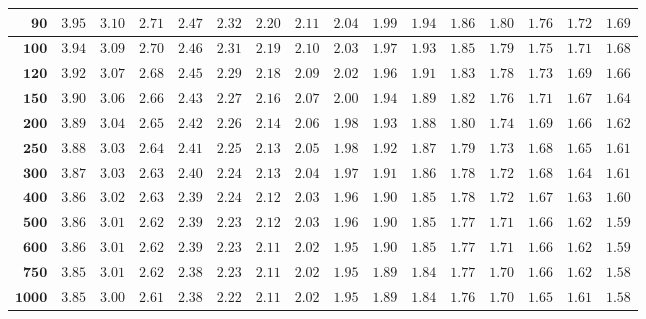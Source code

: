 \begin{customTableWrapper}{1.4}
\begin{longtable}{|r|r|r|r|r|r|r|r|r|r|r|r|r|r|r|r|}
    ${\mathbf{90}}$  & ${3.95}$   & ${3.10}$   & ${2.71}$   & ${2.47}$   & ${2.32}$   & ${2.20}$   & ${2.11}$   & ${2.04}$   & ${1.99}$   & ${1.94}$   & ${1.86}$   & ${1.80}$   & ${1.76}$   & ${1.72}$   & ${1.69}$   \\ \hline
    ${\mathbf{100}}$  & ${3.94}$   & ${3.09}$   & ${2.70}$   & ${2.46}$   & ${2.31}$   & ${2.19}$   & ${2.10}$   & ${2.03}$   & ${1.97}$   & ${1.93}$   & ${1.85}$   & ${1.79}$   & ${1.75}$   & ${1.71}$   & ${1.68}$   \\ \hline
    ${\mathbf{120}}$  & ${3.92}$   & ${3.07}$   & ${2.68}$   & ${2.45}$   & ${2.29}$   & ${2.18}$   & ${2.09}$   & ${2.02}$   & ${1.96}$   & ${1.91}$   & ${1.83}$   & ${1.78}$   & ${1.73}$   & ${1.69}$   & ${1.66}$   \\ \hline
    ${\mathbf{150}}$  & ${3.90}$   & ${3.06}$   & ${2.66}$   & ${2.43}$   & ${2.27}$   & ${2.16}$   & ${2.07}$   & ${2.00}$   & ${1.94}$   & ${1.89}$   & ${1.82}$   & ${1.76}$   & ${1.71}$   & ${1.67}$   & ${1.64}$   \\ \hline
    ${\mathbf{200}}$  & ${3.89}$   & ${3.04}$   & ${2.65}$   & ${2.42}$   & ${2.26}$   & ${2.14}$   & ${2.06}$   & ${1.98}$   & ${1.93}$   & ${1.88}$   & ${1.80}$   & ${1.74}$   & ${1.69}$   & ${1.66}$   & ${1.62}$   \\ \hline
    ${\mathbf{250}}$  & ${3.88}$   & ${3.03}$   & ${2.64}$   & ${2.41}$   & ${2.25}$   & ${2.13}$   & ${2.05}$   & ${1.98}$   & ${1.92}$   & ${1.87}$   & ${1.79}$   & ${1.73}$   & ${1.68}$   & ${1.65}$   & ${1.61}$   \\ \hline
    ${\mathbf{300}}$  & ${3.87}$   & ${3.03}$   & ${2.63}$   & ${2.40}$   & ${2.24}$   & ${2.13}$   & ${2.04}$   & ${1.97}$   & ${1.91}$   & ${1.86}$   & ${1.78}$   & ${1.72}$   & ${1.68}$   & ${1.64}$   & ${1.61}$   \\ \hline
    ${\mathbf{400}}$  & ${3.86}$   & ${3.02}$   & ${2.63}$   & ${2.39}$   & ${2.24}$   & ${2.12}$   & ${2.03}$   & ${1.96}$   & ${1.90}$   & ${1.85}$   & ${1.78}$   & ${1.72}$   & ${1.67}$   & ${1.63}$   & ${1.60}$   \\ \hline
    ${\mathbf{500}}$  & ${3.86}$   & ${3.01}$   & ${2.62}$   & ${2.39}$   & ${2.23}$   & ${2.12}$   & ${2.03}$   & ${1.96}$   & ${1.90}$   & ${1.85}$   & ${1.77}$   & ${1.71}$   & ${1.66}$   & ${1.62}$   & ${1.59}$   \\ \hline
    ${\mathbf{600}}$  & ${3.86}$   & ${3.01}$   & ${2.62}$   & ${2.39}$   & ${2.23}$   & ${2.11}$   & ${2.02}$   & ${1.95}$   & ${1.90}$   & ${1.85}$   & ${1.77}$   & ${1.71}$   & ${1.66}$   & ${1.62}$   & ${1.59}$   \\ \hline
    ${\mathbf{750}}$  & ${3.85}$   & ${3.01}$   & ${2.62}$   & ${2.38}$   & ${2.23}$   & ${2.11}$   & ${2.02}$   & ${1.95}$   & ${1.89}$   & ${1.84}$   & ${1.77}$   & ${1.70}$   & ${1.66}$   & ${1.62}$   & ${1.58}$   \\ \hline
    ${\mathbf{1000}}$  & ${3.85}$   & ${3.00}$   & ${2.61}$   & ${2.38}$   & ${2.22}$   & ${2.11}$   & ${2.02}$   & ${1.95}$   & ${1.89}$   & ${1.84}$   & ${1.76}$   & ${1.70}$   & ${1.65}$   & ${1.61}$   & ${1.58}$   \\ \hline



\end{longtable}
\end{customTableWrapper}
